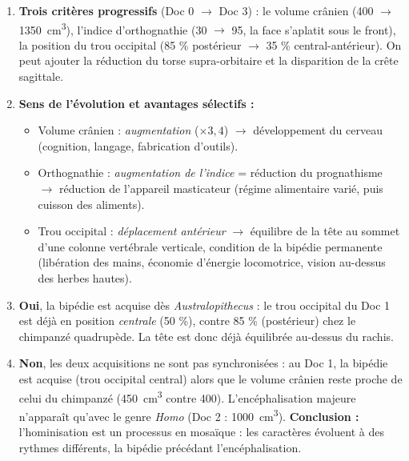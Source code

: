\documentclass[11pt]{article}
\newcommand{\cle}[1]{{\popxbold\color{popdark}#1}}
\begin{document}
\begin{corrige}
\begin{enumerate}
    \item \textbf{Trois critères progressifs} (Doc 0 $\rightarrow$ Doc 3) : le \cle{volume crânien} (400 $\rightarrow$ \SI{1350}{cm^3}), l'\cle{indice d'orthognathie} (30 $\rightarrow$ 95, la face s'aplatit sous le front), la \cle{position du trou occipital} (85 \% postérieur $\rightarrow$ 35 \% central-antérieur). On peut ajouter la réduction du torse supra-orbitaire et la disparition de la crête sagittale.
    \item \textbf{Sens de l'évolution et avantages sélectifs :}
    \begin{itemize}
        \item Volume crânien : \emph{augmentation} ($\times 3,4$) $\rightarrow$ développement du cerveau (cognition, langage, fabrication d'outils).
        \item Orthognathie : \emph{augmentation de l'indice} = réduction du prognathisme $\rightarrow$ réduction de l'appareil masticateur (régime alimentaire varié, puis cuisson des aliments).
        \item Trou occipital : \emph{déplacement antérieur} $\rightarrow$ équilibre de la tête au sommet d'une colonne vertébrale verticale, condition de la bipédie permanente (libération des mains, économie d'énergie locomotrice, vision au-dessus des herbes hautes).
    \end{itemize}
    \item \textbf{Oui}, la bipédie est acquise dès \emph{Australopithecus} : le trou occipital du Doc 1 est déjà en position \emph{centrale} (50 \%), contre 85 \% (postérieur) chez le chimpanzé quadrupède. La tête est donc déjà équilibrée au-dessus du rachis.
    \item \textbf{Non}, les deux acquisitions ne sont pas synchronisées : au Doc 1, la bipédie est acquise (trou occipital central) alors que le volume crânien reste proche de celui du chimpanzé (\SI{450}{cm^3} contre 400). L'encéphalisation majeure n'apparaît qu'avec le genre \emph{Homo} (Doc 2 : \SI{1000}{cm^3}). \textbf{Conclusion :} l'hominisation est un processus en \cle{mosaïque} : les caractères évoluent à des rythmes différents, la bipédie précédant l'encéphalisation.
\end{enumerate}
\end{corrige}
\end{document}
